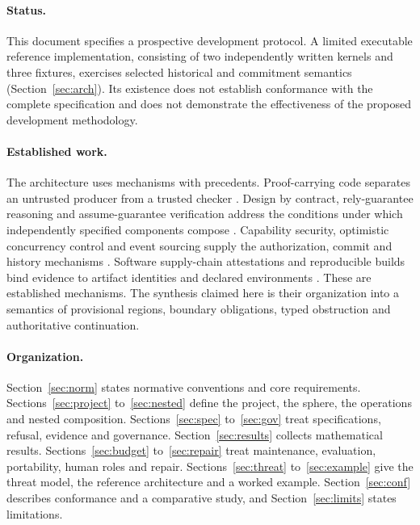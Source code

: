 \documentclass[11pt]{article}
\theoremstyle{remark}
\begin{document}
\paragraph{Status.} This document specifies a prospective development protocol. A limited executable reference implementation, consisting of two independently written kernels and three fixtures, exercises selected historical and commitment semantics (Section~\ref{sec:arch}). Its existence does not establish conformance with the complete specification and does not demonstrate the effectiveness of the proposed development methodology.

\paragraph{Established work.} The architecture uses mechanisms with precedents. Proof-carrying code separates an untrusted producer from a trusted checker \cite{pcc}. Design by contract, rely-guarantee reasoning and assume-guarantee verification address the conditions under which independently specified components compose \cite{meyer,jones,misra}. Capability security, optimistic concurrency control and event sourcing supply the authorization, commit and history mechanisms \cite{dennis,kung,fowler}. Software supply-chain attestations and reproducible builds bind evidence to artifact identities and declared environments \cite{intoto,lamb}. These are established mechanisms. The synthesis claimed here is their organization into a semantics of provisional regions, boundary obligations, typed obstruction and authoritative continuation.

\paragraph{Organization.} Section~\ref{sec:norm} states normative conventions and core requirements. Sections~\ref{sec:project} to~\ref{sec:nested} define the project, the sphere, the operations and nested composition. Sections~\ref{sec:spec} to~\ref{sec:gov} treat specifications, refusal, evidence and governance. Section~\ref{sec:results} collects mathematical results. Sections~\ref{sec:budget} to~\ref{sec:repair} treat maintenance, evaluation, portability, human roles and repair. Sections~\ref{sec:threat} to~\ref{sec:example} give the threat model, the reference architecture and a worked example. Section~\ref{sec:conf} describes conformance and a comparative study, and Section~\ref{sec:limits} states limitations.
\end{document}
